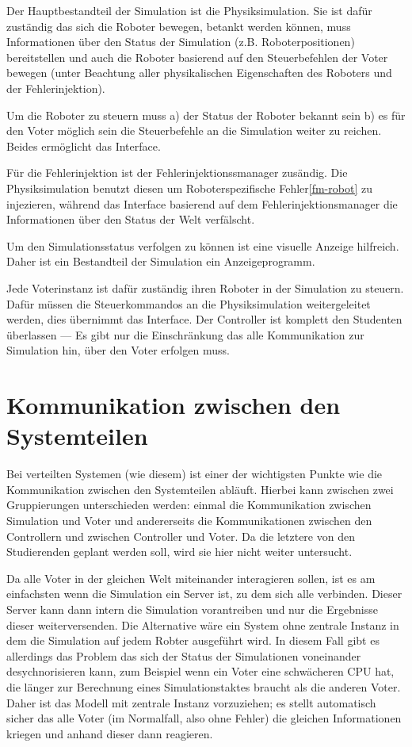 Der Hauptbestandteil der Simulation ist die Physiksimulation. Sie ist daf{\"{u}}r zust{\"{a}}ndig
das sich die Roboter bewegen, betankt werden k{\"{o}}nnen, muss Informationen {\"{u}}ber den
Status der Simulation (z.B. Roboterpositionen) bereitstellen und auch die Roboter basierend
auf den Steuerbefehlen der Voter bewegen (unter Beachtung aller physikalischen Eigenschaften
des Roboters und der Fehlerinjektion).

Um die Roboter zu steuern muss a) der Status der Roboter bekannt sein b) es f{\"{u}}r den
Voter m{\"{o}}glich sein die Steuerbefehle an die Simulation weiter zu reichen. Beides
erm{\"{o}}glicht das Interface.

F{\"{u}}r die Fehlerinjektion ist der Fehlerinjektionssmanager zus{\"{a}}ndig. Die Physiksimulation
benutzt diesen um Roboterspezifische Fehler\ref{fm-robot} zu injezieren, w{\"{a}}hrend das
Interface basierend auf dem Fehlerinjektionsmanager die Informationen {\"{u}}ber den
Status der Welt verf{\"{a}}lscht.

Um den Simulationsstatus verfolgen zu k{\"{o}}nnen ist eine visuelle Anzeige hilfreich. Daher
ist ein Bestandteil der Simulation ein Anzeigeprogramm.

Jede Voterinstanz ist daf{\"{u}}r zust{\"{a}}ndig ihren Roboter in der Simulation zu steuern.
Daf{\"{u}}r m{\"{u}}ssen die Steuerkommandos an die Physiksimulation weitergeleitet werden,
dies {\"{u}}bernimmt das Interface. Der Controller ist komplett den Studenten {\"{u}}berlassen ---
Es gibt nur die Einschr{\"{a}}nkung das alle Kommunikation zur Simulation hin, {\"{u}}ber den Voter erfolgen muss.

\clearpage
\section{Kommunikation zwischen den Systemteilen}
Bei verteilten Systemen (wie diesem) ist einer der wichtigsten Punkte wie die Kommunikation zwischen den Systemteilen abl{\"{a}}uft.
Hierbei kann zwischen zwei Gruppierungen unterschieden werden: einmal die Kommunikation zwischen Simulation und Voter und andererseits
die Kommunikationen zwischen den Controllern und zwischen Controller und Voter. Da die letztere von den Studierenden geplant werden soll,
wird sie hier nicht weiter untersucht.

Da alle Voter in der gleichen Welt miteinander interagieren sollen, ist es am einfachsten wenn die Simulation ein Server ist, zu dem sich alle
verbinden. Dieser Server kann dann intern die Simulation vorantreiben und nur die Ergebnisse dieser weiterversenden. Die Alternative
w{\"{a}}re ein System ohne zentrale Instanz in dem die Simulation auf jedem Robter ausgef{\"{u}}hrt wird. In diesem Fall gibt es
allerdings das Problem das sich der Status der Simulationen voneinander desychnorisieren kann, zum Beispiel wenn ein Voter
eine schw{\"{a}}cheren CPU hat, die l{\"{a}}nger zur Berechnung eines Simulationstaktes braucht als die anderen Voter. Daher ist
das Modell mit zentrale Instanz vorzuziehen; es stellt automatisch sicher das alle Voter (im Normalfall, also ohne Fehler)
die gleichen Informationen kriegen und anhand dieser dann reagieren.

